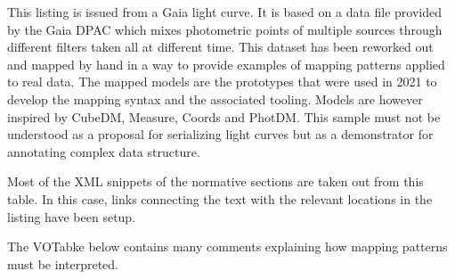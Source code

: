 This listing is issued from a Gaia light curve. 
It is based on a data file provided by the Gaia DPAC which mixes photometric points of multiple sources 
through different filters taken all at different time.
This dataset has been reworked out and mapped by hand in a way to provide examples of mapping patterns 
applied to real data.
The mapped models are the prototypes that were used in 2021 to develop the mapping syntax 
and the associated tooling. Models are however inspired by CubeDM, Measure, Coords and PhotDM.
This sample must not be understood as a proposal for serializing light curves but as a demonstrator for annotating complex
data structure.

Most of the XML snippets of the normative sections are taken out from this table. 
In this case, links connecting the text with the relevant locations in the listing have been setup.

The VOTabke below contains many comments explaining how mapping patterns must be interpreted.



